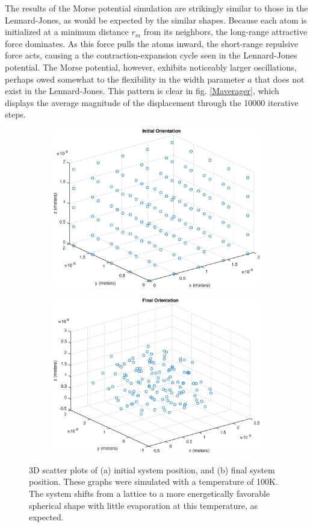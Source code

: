 \documentclass[12pt]{article}
\begin{document}
The results of the Morse potential simulation are strikingly similar to those in the Lennard-Jones, as would be expected by the similar shapes.  Because each atom is initialized at a minimum distance $r_m$ from its neighbors, the long-range attractive force dominates.  As this force pulls the atoms inward, the short-range repulsive force acts, causing a the contraction-expansion cycle seen in the Lennard-Jones potential.  The Morse potential, however, exhibits noticeably larger oscillations, perhaps owed somewhat to the flexibility in the width parameter $a$ that does not exist in the Lennard-Jones.  This pattern is clear in fig. \ref{Maverager}, which displays the average magnitude of the displacement through the 10000 iterative steps.

\begin{figure}[!h]
\begin{subfigure}{0.5\textwidth}
\includegraphics[width=0.9\linewidth]{./finalpics/Minitial.eps}
\caption{\label{Minitial}}
\end{subfigure}
\begin{subfigure}{0.5\textwidth}
\includegraphics[width=0.9\linewidth]{./finalpics/Mfinal.eps}
\caption{\label{Mfinal}}
\end{subfigure}
\caption{3D scatter plots of (a) initial system position, and (b) final system position.  These graphs were simulated with a temperature of 100K.  The system shifts from a lattice to a more energetically favorable spherical shape with little evaporation at this temperature, as expected.} 
\end{figure}
\end{document}
